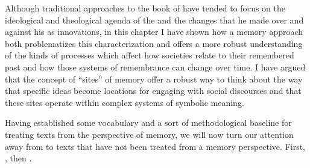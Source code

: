 Although traditional approaches to the book of \chronicles have tended to focus on the ideological and theological agenda of the \chronicler and the changes that he made over and against his \vorlage as innovations, in this chapter I have shown how a memory approach both problematizes this characterization and offers a more robust understanding of the kinds of processes which affect how societies relate to their remembered past and how those systems of remembrance can change over time. I have argued that the concept of ``sites'' of memory offer a robust way to think about the way that specific ideas become locations for engaging with social discourses and that these sites operate within complex systems of symbolic meaning.

Having established some vocabulary and a sort of methodological baseline for treating \rwb texts from the perspective of memory, we will now turn our attention away from \chronicles to \rwb texts that have not been treated from a memory perspective. First, \ga, then \jub.